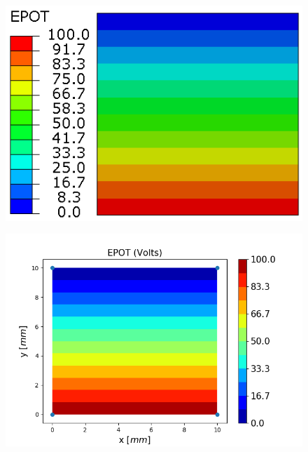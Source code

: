 \documentclass[11pt]{article}
\begin{document}
\begin{figure}[H]
	\centering
	\begin{minipage}{.5\textwidth}
		\centering
		\includegraphics[width=1\linewidth]{E1EPOT.png}
		\label{E1EPOT}
	\end{minipage}%
	\begin{minipage}{.7\textwidth}
		\centering
		\includegraphics[width=1\linewidth]{E1EPOT_IGA.png}
		\label{E1EPOT_IGA}
	\end{minipage}
\end{figure}
\end{document}

